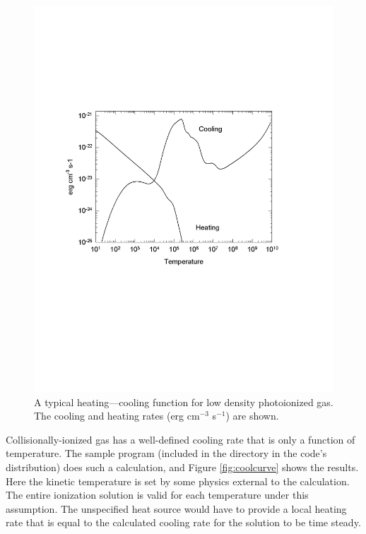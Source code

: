 \begin{figure}
\centering
\includegraphics[scale=0.8]{cooling_heating}
\caption[Cooling and heating in a photoionized gas]{\label{fig:cooling_heating}A typical heating---cooling function for low density photoionized
gas. The cooling and heating rates (erg cm$^{-3}$ s$^{-1}$) are shown.  }
\end{figure}

Collisionally-ionized gas has a well-defined cooling rate that is only
a function of temperature.
The sample program
(included in the  directory in the code's
distribution)  does such a
calculation, and Figure \ref{fig:coolcurve} shows the results.
Here the kinetic temperature
is set by some physics external to the calculation.
The entire ionization
solution is valid for each temperature under this assumption.
The
unspecified heat source would have to provide a local heating rate that
is equal to the calculated cooling rate for the solution to be time steady.

